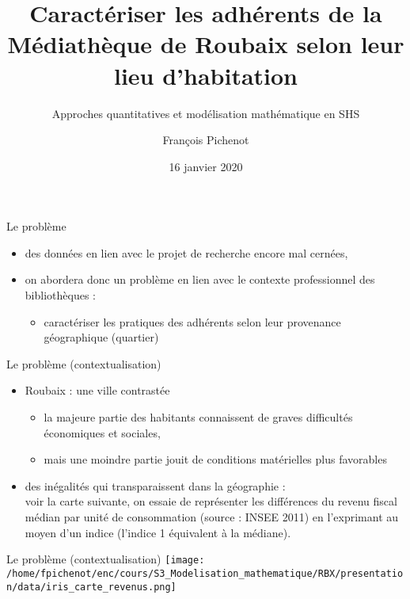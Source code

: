 \documentclass{beamer}
\title{Caractériser les adhérents de la Médiathèque de Roubaix selon leur lieu d'habitation}
\subtitle{Approches quantitatives et modélisation mathématique en SHS}
\author{François Pichenot}
\institute{Université Paris Sciences et Lettres - École nationale des chartes\\Master Humanités numériques et computationnelles}
\date{16 janvier 2020}
\begin{document}
\begin{frame}
	\titlepage
\end{frame}

\begin{frame}{Le problème}
	\begin{itemize}
    	\item des données en lien avec le projet de recherche encore mal cernées,
    	\item on abordera donc un problème en lien avec le contexte professionnel des bibliothèques :
    	\begin{itemize}
    		\item caractériser les pratiques des adhérents selon leur provenance géographique (quartier)
    	\end{itemize}
	\end{itemize}
\end{frame}

\begin{frame}{Le problème (contextualisation)}
	\begin{itemize}
    	\item Roubaix : une ville contrastée
    	\begin{itemize}
    		\item la majeure partie des habitants connaissent de graves difficultés économiques et sociales,
    		\item mais une moindre partie jouit de conditions matérielles plus favorables
    	\end{itemize}
    	\item des inégalités qui transparaissent dans la géographie :\\voir la carte suivante, on essaie de représenter les différences du revenu fiscal médian par unité de consommation (source : INSEE 2011) en l’exprimant au moyen d’un indice (l’indice 1 équivalent à la médiane).
	\end{itemize}
\end{frame}

\begin{frame}{Le problème (contextualisation)}
	\texttt{[image: /home/fpichenot/enc/cours/S3\_Modelisation\_mathematique/RBX/presentation/data/iris\_carte\_revenus.png]}
\end{frame}
\end{document}
